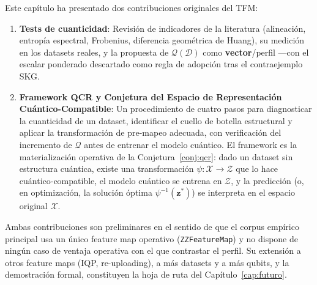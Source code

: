 Este capítulo ha presentado dos contribuciones originales del TFM:

\begin{enumerate}
    \item \textbf{Tests de cuanticidad}: Revisión de indicadores de la literatura (alineación, entropía espectral, Frobenius, diferencia geométrica de Huang), su medición en los datasets reales, y la propuesta de $\mathcal{Q}(\mathcal{D})$ como \textbf{vector}/perfil ---con el escalar ponderado descartado como regla de adopción tras el contraejemplo SKG.

    \item \textbf{Framework QCR y Conjetura del Espacio de Representación Cuántico-Compatible}: Un procedimiento de cuatro pasos para diagnosticar la cuanticidad de un dataset, identificar el cuello de botella estructural y aplicar la transformación de pre-mapeo adecuada, con verificación del incremento de $\mathcal{Q}$ antes de entrenar el modelo cuántico. El framework es la materialización operativa de la Conjetura~\ref{conj:qcr}: dado un dataset sin estructura cuántica, existe una transformación $\psi: \mathcal{X} \rightarrow \mathcal{Z}$ que lo hace cuántico-compatible, el modelo cuántico se entrena en $\mathcal{Z}$, y la predicción (o, en optimización, la solución óptima $\psi^{-1}(\mathbf{z}^*)$) se interpreta en el espacio original $\mathcal{X}$.
\end{enumerate}

Ambas contribuciones son preliminares en el sentido de que el corpus empírico principal usa un único feature map operativo (\texttt{ZZFeatureMap}) y no dispone de ningún caso de ventaja operativa con el que contrastar el perfil. Su extensión a otros feature maps (IQP, re-uploading), a más datasets y a más qubits, y la demostración formal, constituyen la hoja de ruta del Capítulo~\ref{cap:futuro}.
